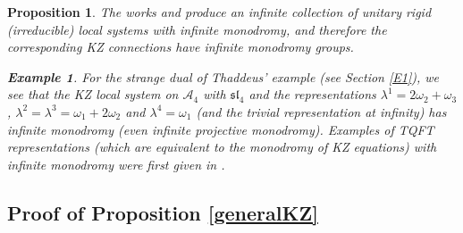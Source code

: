 \documentclass[11pt]{amsart}
\newtheorem{proposition}[theorem]{Proposition}
\numberwithin{theorem}{subsection}
\newtheorem{example}[theorem]{\bf Example}
\begin{document}
{\begin{proposition}
The works \cite{BH} and \cite{Haraoka} produce an infinite collection of unitary rigid (irreducible) local systems with infinite monodromy, and therefore the corresponding KZ connections have infinite monodromy groups.
\begin{example}
For  the strange dual of Thaddeus' example (see Section \ref{E1}), we see that the KZ local system on $\mathcal{A}_4$ with  $\mathfrak{sl}_4$ and the representations $\lambda^1=2\omega_2+\omega_3$,
$\lambda^2=\lambda^3=\omega_1+2\omega_2$ and $\lambda^4=\omega_1$ (and the trivial representation at infinity) has infinite monodromy (even infinite projective monodromy). Examples of TQFT representations (which are equivalent to the monodromy of KZ equations) with infinite monodromy were first given in \cite{Masbaum}.
\end{example}
\subsection{Proof of  Proposition \ref{generalKZ}}

\end{proposition}}
\end{document}
